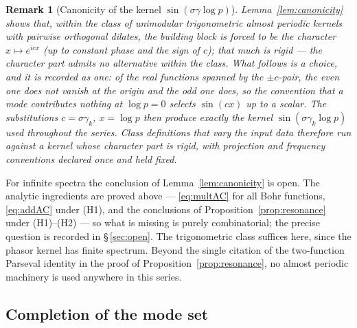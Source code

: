 \documentclass[11pt]{article}
\newtheorem*{remark}{Remark}
\begin{document}
\begin{remark}[Canonicity of the kernel $\sin(\sigma\gamma\log p)$]
Lemma~\ref{lem:canonicity} shows that, within the class of unimodular
trigonometric almost periodic kernels with pairwise orthogonal dilates,
the building block is forced to be the character $x\mapsto e^{icx}$
(up to constant phase and the sign of $c$); that much is rigid --- the
character part admits no alternative within the class. What follows is a
choice, and it is recorded as one: of the
real functions spanned by the $\pm c$-pair, the even one does not vanish at the
origin and the odd one does, so the convention that a mode contributes nothing
at $\log p=0$ selects $\sin(cx)$ up to a scalar. The substitutions
$c=\sigma\gamma_k$, $x=\log p$ then produce exactly the kernel
$\sin(\sigma\gamma_k\log p)$ used throughout the series. Class definitions
that vary the input data therefore run against a kernel whose character part
is rigid, with projection and frequency conventions declared once and held
fixed.
\end{remark}

For infinite spectra the conclusion of Lemma~\ref{lem:canonicity} is open.
The analytic ingredients are proved above --- \eqref{eq:multAC} for all Bohr
functions, \eqref{eq:addAC} under (H1), and the conclusions of
Proposition~\ref{prop:resonance} under (H1)--(H2) --- so what is missing is
purely combinatorial; the precise question is recorded in
\S\,\ref{sec:open}. The trigonometric class suffices here, since the
phasor kernel has finite spectrum. Beyond the single citation of the
two-function Parseval identity in the proof of
Proposition~\ref{prop:resonance}, no almost periodic machinery is used
anywhere in this series.

\subsection{Completion of the mode set}
\end{document}
